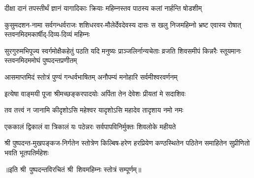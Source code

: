 \twolineshloka
{दीक्षा दानं तपस्तीर्थं ज्ञानं यागादिकाः क्रियाः}
{महिम्नस्तव पाठस्य कलां नार्हन्ति षोडशीम्}

\fourlineindentedshloka
{कुसुमदशन-नामा सर्वगन्धर्वराजः}
{शशिधरवर-मौलेर्देवदेवस्य दासः}
{स खलु निजमहिम्नो भ्रष्ट एवास्य रोषात्}
{स्तवनमिदमकार्षीद्-दिव्य-दिव्यं महिम्नः}

\fourlineindentedshloka
{सुरगुरुमभिपूज्य स्वर्गमोक्षैकहेतुं}
{पठति यदि मनुष्यः प्राञ्जलिर्नान्यचेताः}
{व्रजति शिवसमीपं किन्नरैः स्तूयमानः}
{स्तवनमिदममोघं पुष्पदन्तप्रणीतम्}

\twolineshloka
{आसमाप्तमिदं स्तोत्रं पुण्यं गन्धर्वभाषितम्}
{अनौपम्यं मनोहारि सर्वमीश्वरवर्णनम्}

\twolineshloka
{इत्येषा वाङ्मयी पूजा श्रीमच्छङ्करपादयोः}
{अर्पिता तेन देवेशः प्रीयतां मे सदाशिवः}

\twolineshloka
{तव तत्त्वं न जानामि कीदृशोऽसि महेश्वर}
{यादृशोऽसि महादेव तादृशाय नमो नमः}

\twolineshloka
{एककालं द्विकालं वा त्रिकालं यः पठेन्नरः}
{सर्वपापविनिर्मुक्तः शिवलोके महीयते}

\fourlineindentedshloka
{श्री पुष्पदन्त-मुखपङ्कज-निर्गतेन}
{स्तोत्रेण किल्बिष-हरेण हरप्रियेण}
{कण्ठस्थितेन पठितेन समाहितेन}
{सुप्रीणितो भवति भूतपतिर्महेशः}

॥इति श्री~पुष्पदन्तविरचितं श्री~शिवमहिम्नः स्तोत्रं सम्पूर्णम्॥